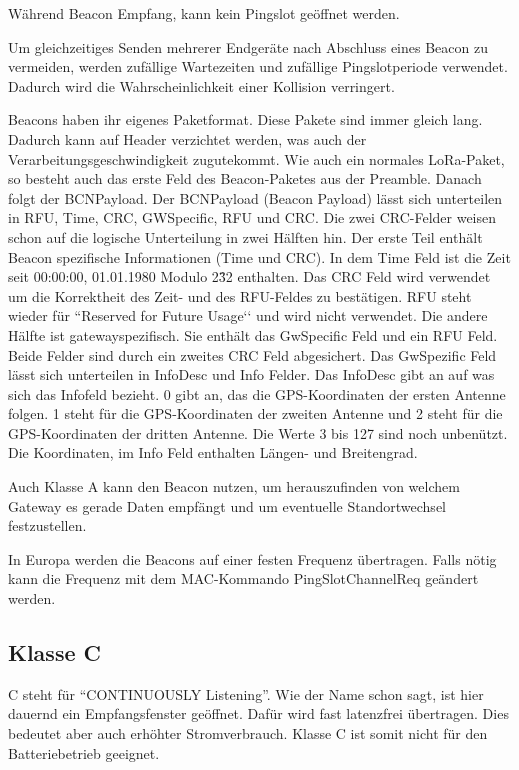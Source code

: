 \documentclass[a4paper, 12pt]{article}
\begin{document}
                Während Beacon Empfang, kann kein Pingslot geöffnet werden.
                
                Um gleichzeitiges Senden mehrerer Endgeräte nach Abschluss eines Beacon zu vermeiden,
                werden zufällige Wartezeiten und zufällige Pingslotperiode verwendet. Dadurch wird die Wahrscheinlichkeit 
                einer Kollision verringert.

                Beacons haben ihr eigenes Paketformat. Diese Pakete sind immer gleich lang. Dadurch kann auf Header 
                verzichtet werden, was auch der Verarbeitungsgeschwindigkeit zugutekommt. Wie auch ein normales 
                LoRa-Paket, so besteht auch das erste Feld des Beacon-Paketes aus der Preamble. Danach folgt der 
                BCNPayload. Der BCNPayload (Beacon Payload) lässt sich unterteilen in RFU, Time, CRC, GWSpecific, 
                RFU und CRC. Die zwei CRC-Felder weisen schon auf die logische Unterteilung in zwei Hälften hin. Der 
                erste Teil enthält Beacon spezifische Informationen (Time und CRC). In dem Time Feld ist die Zeit 
                seit 00:00:00, 01.01.1980 Modulo 2\^32 enthalten. Das CRC Feld wird verwendet um die Korrektheit des 
                Zeit- und des RFU-Feldes zu bestätigen. RFU steht wieder für ``Reserved for Future Usage‘‘ und wird 
                nicht verwendet. Die andere Hälfte ist gatewayspezifisch. Sie enthält das GwSpecific Feld und ein 
                RFU Feld. Beide Felder sind durch ein zweites CRC Feld abgesichert. Das GwSpezific Feld lässt 
                sich unterteilen in InfoDesc und Info Felder. Das InfoDesc gibt an auf was sich das Infofeld bezieht. 
                0 gibt an, das die GPS-Koordinaten der ersten Antenne folgen. 1 steht für die GPS-Koordinaten der 
                zweiten Antenne und 2 steht für die GPS-Koordinaten der dritten Antenne. Die Werte 3 bis 127 sind noch unbenützt.
                Die Koordinaten, im Info Feld enthalten Längen- und Breitengrad.
                
                Auch Klasse A kann den Beacon nutzen, um herauszufinden von welchem Gateway es gerade Daten empfängt 
                und um eventuelle Standortwechsel festzustellen.
                
                In Europa werden die Beacons auf einer festen Frequenz übertragen. Falls nötig kann die Frequenz mit dem  
                MAC-Kommando PingSlotChannelReq geändert werden.
        \subsection{Klasse C}
            C steht für ``CONTINUOUSLY Listening''. Wie der Name schon sagt, ist hier dauernd ein Empfangsfenster geöffnet.
            Dafür wird fast latenzfrei übertragen. Dies bedeutet aber auch erhöhter Stromverbrauch. Klasse C ist somit 
            nicht für den Batteriebetrieb geeignet. 
\end{document}
